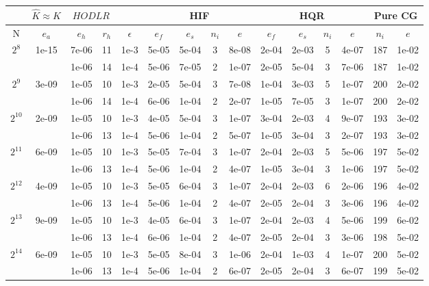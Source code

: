 \documentclass[11pt]{article}
\begin{document}
\begin{table}[!htbp]
\centering
\begin{tabular}{|c|c|c|c|c|c|c|c|c|c|c|c|c|c|c|}
\hline
\multicolumn{1}{c|}{} & \multicolumn{1}{c|}{$\hat{K} \approx K$} & \multicolumn{2}{c|}{$HODLR$} & \multicolumn{1}{c|}{} &\multicolumn{4}{c|}{HIF} & \multicolumn{4}{c|}{HQR} & \multicolumn{2}{c|}{Pure CG} \\
\hline
N & $e_{a}$ & $e_{h}$ & $r_{h}$ & $\epsilon$ & $e_{f}$ & $e_{s}$ & $n_{i}$ & $e$ & $e_{f}$  & $e_{s}$ & $n_{i}$ & $e$ &  $n_{i}$ & $e$ \\ 
\hline
$2^{8}$ & 1e-15 & 7e-06 & 11 & 1e-3 & 5e-05 & 5e-04 & 3 & 8e-08 & 2e-04 & 2e-03 & 5 & 4e-07 & 187 & 1e-02\\
~ & ~ & 1e-06 & 14 & 1e-4 & 5e-06 & 7e-05 & 2 & 1e-07 & 2e-05 & 5e-04 & 3 & 7e-06 & 187 & 1e-02\\
\hline
$2^{9}$ & 3e-09 & 1e-05 & 10 & 1e-3 & 2e-05 & 5e-04 & 3 & 7e-08 & 1e-04 & 3e-03 & 5 & 1e-07 & 200 & 2e-02\\
~ & ~ & 1e-06 & 14 & 1e-4 & 6e-06 & 1e-04 & 2 & 2e-07 & 1e-05 & 7e-05 & 3 & 1e-07 & 200 & 2e-02\\
\hline
$2^{10}$ & 2e-09 & 1e-05 & 10 & 1e-3 & 4e-05 & 5e-04 & 3 & 1e-07 & 3e-04 & 2e-03 & 4 & 9e-07 & 193 & 3e-02\\
~ & ~ & 1e-06 & 13 & 1e-4 & 5e-06 & 1e-04 & 2 & 5e-07 & 1e-05 & 3e-04 & 3 & 2e-07 & 193 & 3e-02\\
\hline
$2^{11}$ & 6e-09 & 1e-05 & 10 & 1e-3 & 5e-05 & 7e-04 & 3 & 1e-07 & 2e-04 & 2e-03 & 5 & 5e-06 & 197 & 5e-02\\
~ & ~ & 1e-06 & 13 & 1e-4 & 5e-06 & 1e-04 & 2 & 4e-07 & 1e-05 & 3e-04 & 3 & 1e-06 & 197 & 5e-02\\
\hline
$2^{12}$ & 4e-09 & 1e-05 & 10 & 1e-3 & 5e-05 & 6e-04 & 3 & 1e-07 & 2e-04 & 2e-03 & 6 & 2e-06 & 196 & 4e-02\\
~ & ~ & 1e-06 & 13 & 1e-4 & 5e-06 & 1e-04 & 2 & 4e-07 & 2e-05 & 2e-04 & 3 & 3e-06 & 196 & 4e-02\\
\hline
$2^{13}$ & 9e-09 & 1e-05 & 10 & 1e-3 & 4e-05 & 6e-04 & 3 & 1e-07 & 2e-04 & 2e-03 & 4 & 5e-06 & 199 & 6e-02\\
~ & ~ & 1e-06 & 13 & 1e-4 & 6e-06 & 1e-04 & 2 & 4e-07 & 2e-05 & 2e-04 & 3 & 3e-06 & 198 & 5e-02\\
\hline
$2^{14}$ & 6e-09 & 1e-05 & 10 & 1e-3 & 5e-05 & 8e-04 & 3 & 1e-06 & 2e-04 & 1e-03 & 4 & 1e-07 & 200 & 5e-02\\
~ & ~ & 1e-06 & 13 & 1e-4 & 5e-06 & 1e-04 & 2 & 6e-07 & 2e-05 & 2e-04 & 3 & 6e-07 & 199 & 5e-02\\

\end{tabular}
\end{table}
\end{document}
